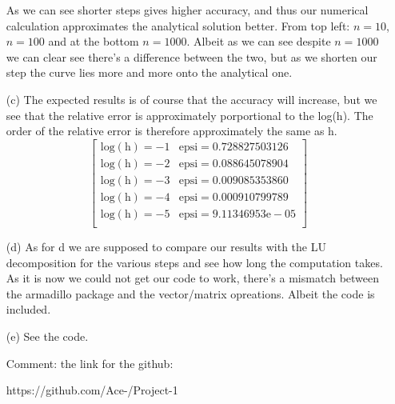 \documentclass{article}
\newcommand{\beq}{\begin{equation}}
\newcommand{\eeq}{\end{equation}}
\begin{document}
\begin{enumerate}
As we can see shorter steps gives higher accuracy, and thus our numerical calculation approximates the analytical solution better. From top left: $n=10$, $n=100$ and at the bottom $n=1000$. Albeit as we can see despite $n=1000$ we can clear see there's a difference between the two, but as we shorten our step the curve lies more and more onto the analytical one. 
 
\item[(c)]
The expected results is of course that the accuracy will increase, but we see that the relative error is approximately porportional to the log(h). The order of the relative error is therefore approximately the same as h.
\beq
\left[\begin{array}{cc}
                          \mathrm{log(h) = -1} & \mathrm{epsi=0.728827503126}\\
                          \mathrm{log(h) = -2} & \mathrm{epsi=0.088645078904}\\
                          \mathrm{log(h) = -3} & \mathrm{epsi=0.009085353860}\\
                          \mathrm{log(h) = -4} & \mathrm{epsi=0.000910799789}\\
                          \mathrm{log(h) = -5} & \mathrm{epsi=9.11346953e-05}\\
                      \end{array} \right]
\eeq
\newpage
\item[(d)]
As for d we are supposed to compare our results with the LU decomposition for the various steps and see how long the computation takes. As it is now we could not get our code to work, there's a mismatch between the armadillo package and the vector/matrix opreations. Albeit the code is included. 

\item[(e)]
See the code.


Comment: the link for the github: 

https://github.com/Ace-/Project-1
\end{enumerate}
%
\end{document}
